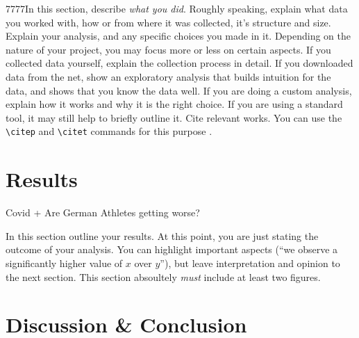 7777In this section, describe \emph{what you did}. Roughly speaking, explain what data you worked with, how or from where it was collected, it's structure and size. Explain your analysis, and any specific choices you made in it. Depending on the nature of your project, you may focus more or less on certain aspects. If you collected data yourself, explain the collection process in detail. If you downloaded data from the net, show an exploratory analysis that builds intuition for the data, and shows that you know the data well. If you are doing a custom analysis, explain how it works and why it is the right choice. If you are using a standard tool, it may still help to briefly outline it. Cite relevant works. You can use the \verb|\citep| and \verb|\citet| commands for this purpose \citep{mackay2003information}.

% 

\section{Results}\label{sec:results}

Covid + Are German Athletes getting worse?

In this section outline your results. At this point, you are just stating the outcome of your analysis. You can highlight important aspects (``we observe a significantly higher value of $x$ over $y$''), but leave interpretation and opinion to the next section. This section absoultely \emph{must} include at least two figures.

\section{Discussion \& Conclusion}\label{sec:conclusion}

